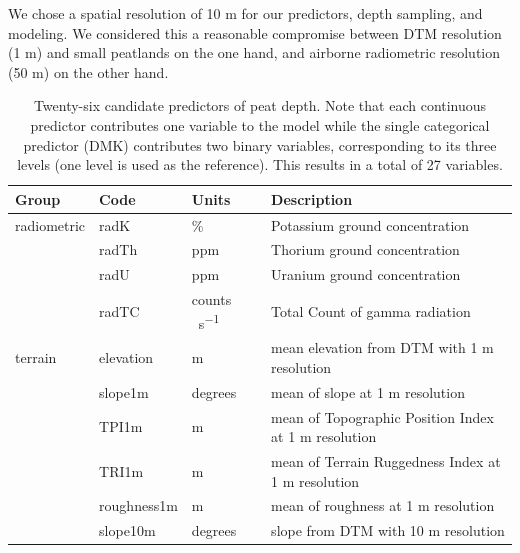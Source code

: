 \documentclass[soil, manuscript]{copernicus}
\begin{document}
We chose a spatial resolution of 10 m for our predictors, depth sampling, and modeling.
We considered this a reasonable compromise between DTM resolution (1 m) and small peatlands on the one hand, and airborne radiometric resolution (50 m) on the other hand.

\begin{table}[tbp]
\caption{Twenty-six candidate predictors of peat depth. Note that each continuous predictor contributes one variable to the model while the single categorical predictor (DMK) contributes two binary variables, corresponding to its three levels (one level is used as the reference). 
This results in a total of 27 variables.}
\begin{tabular}{llll}
\hline
Group        & Code         & Units                 & Description                                                            \\ \hline
radiometric  & radK         & \%                    & Potassium ground concentration                                         \\ 
             & radTh        & ppm                   & Thorium ground concentration                                           \\
             & radU         & ppm                   & Uranium ground concentration                                           \\
             & radTC        & \unit{counts\,s^{-1}} & Total Count of gamma radiation                                         \\
terrain      & elevation    & m                     & mean elevation from DTM with 1 m resolution                            \\
             & slope1m      & degrees               & mean of slope at 1 m resolution                                        \\
             & TPI1m        & m                     & mean of Topographic Position Index at 1 m resolution                   \\
             & TRI1m        & m                     & mean of Terrain Ruggedness Index at 1 m resolution                     \\
             & roughness1m  & m                     & mean of roughness at 1 m resolution                                    \\
             & slope10m     & degrees               & slope from DTM with 10 m resolution                                    \\

\end{tabular}
\end{table}
\end{document}

